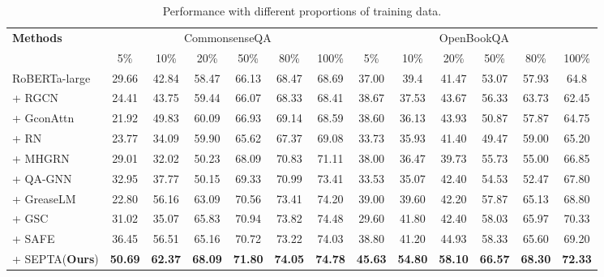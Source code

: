\documentclass[runningheads]{llncs}
\begin{document}
\begin{table}[t!]
\centering
\caption{Performance with different proportions of training data.}
\resizebox{0.95\linewidth}{!} {
\begin{tabular}{lcccccccccccc}
    \toprule
        \multirow{2}{*}{\textbf{Methods}}&
        \multicolumn{6}{c}{CommonsenseQA} & \multicolumn{6}{c}{OpenBookQA}\\
        \cmidrule(lr){2-7} \cmidrule(lr){8-13}
        & 5\% & 10\% & 20\% & 50\% & 80\% & 100\% & 5\% & 10\% & 20\% & 50\% & 80\%  & 100\%\\
        \midrule
        RoBERTa-large & 29.66 & 42.84 & 58.47 & 66.13 & 68.47 & 68.69 & 37.00 & 39.4 & 41.47 & 53.07 & 57.93 & 64.8\\
        \midrule
        + RGCN & 24.41 & 43.75 & 59.44 & 66.07 & 68.33 & 68.41 & 38.67 & 37.53 & 43.67 & 56.33 & 63.73 & 62.45\\
        + GconAttn & 21.92 & 49.83 & 60.09 & 66.93 & 69.14 & 68.59 & 38.60 & 36.13 & 43.93 & 50.87 & 57.87 & 64.75\\
        + RN & 23.77 & 34.09 & 59.90 & 65.62 & 67.37 & 69.08 & 33.73 & 35.93 & 41.40 & 49.47 & 59.00 & 65.20\\
        + MHGRN & 29.01 & 32.02 & 50.23 & 68.09 & 70.83 & 71.11 & 38.00 & 36.47 & 39.73 & 55.73 & 55.00 & 66.85\\
        + QA-GNN & 32.95 & 37.77 & 50.15 & 69.33 & 70.99 & 73.41 & 33.53 & 35.07 & 42.40 & 54.53 & 52.47 & 67.80\\
        + GreaseLM & 22.80 & 56.16 & 63.09 & 70.56& 73.41& 74.20& 39.00&39.60&42.20&57.87 & 65.13&68.80\\
        + GSC & 31.02 & 35.07 & 65.83 & 70.94& 73.82& 74.48 & 29.60 & 41.80 & 42.40 & 58.03 & 65.97 & 70.33\\
        + SAFE & 36.45 & 56.51 & 65.16 & 70.72 & 73.22 & 74.03 & 38.80 & 41.20 & 44.93 & 58.33 & 65.60 & 69.20 \\
        \midrule
        + SEPTA(\textbf{Ours}) & \textbf{50.69} & \textbf{62.37} & \textbf{68.09} & \textbf{71.80} & \textbf{74.05} & \textbf{74.78} & \textbf{45.63} & \textbf{54.80} & \textbf{58.10} & \textbf{66.57} & \textbf{68.30} & \textbf{72.33}\\
    \bottomrule
\end{tabular}
}
\label{tab:few-shot}
\end{table}
\end{document}
